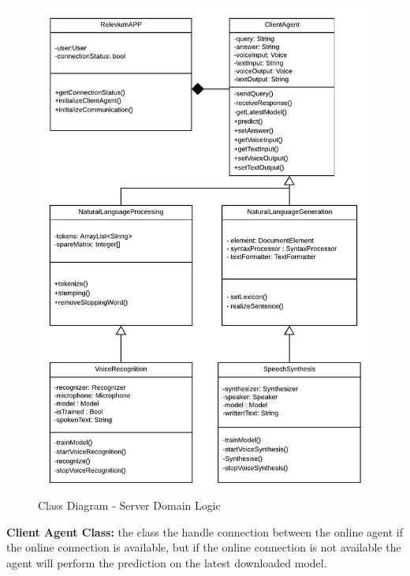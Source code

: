 \documentclass{scrreprt}
\begin{document}
\begin{figure}[ht!]
    \includegraphics[height=.93\textheight]{img3/ClassDClass1DIV.pdf}
    \caption{Class Diagram - Server Domain Logic}
    \label{fig:classdiagram2}
\end{figure}

\textbf{Client Agent Class:} the class the handle connection between the online agent if the online connection is available, but if the online connection is not available the agent will perform the prediction on the latest downloaded model.
\end{document}
